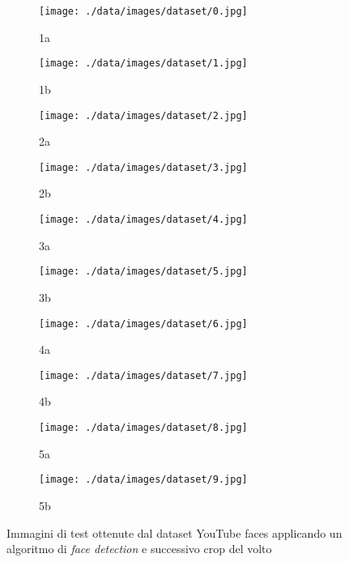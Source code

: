 \begin{figure}
	\centering
	\begin{subfigure}{0.2 \textwidth}
		\texttt{[image: ./data/images/dataset/0.jpg]}
		\caption{1a}
	\end{subfigure}
	\begin{subfigure}{0.2 \textwidth}
		\texttt{[image: ./data/images/dataset/1.jpg]}
		\caption{1b}
	\end{subfigure}
	\begin{subfigure}{0.2 \textwidth}
		\texttt{[image: ./data/images/dataset/2.jpg]}
		\caption{2a}
	\end{subfigure}
	\begin{subfigure}{0.2 \textwidth}
		\texttt{[image: ./data/images/dataset/3.jpg]}
		\caption{2b}
	\end{subfigure}
	\begin{subfigure}{0.2 \textwidth}
		\texttt{[image: ./data/images/dataset/4.jpg]}
		\caption{3a}
	\end{subfigure}
	\begin{subfigure}{0.2 \textwidth}
		\texttt{[image: ./data/images/dataset/5.jpg]}
		\caption{3b}
	\end{subfigure}
	\begin{subfigure}{0.2 \textwidth}
		\texttt{[image: ./data/images/dataset/6.jpg]}
		\caption{4a}
	\end{subfigure}
	\begin{subfigure}{0.2 \textwidth}
		\texttt{[image: ./data/images/dataset/7.jpg]}
		\caption{4b}
	\end{subfigure}
	\begin{subfigure}{0.2 \textwidth}
		\texttt{[image: ./data/images/dataset/8.jpg]}
		\caption{5a}
	\end{subfigure}
	\begin{subfigure}{0.2 \textwidth}
		\texttt{[image: ./data/images/dataset/9.jpg]}
		\caption{5b}
	\end{subfigure}
	\caption{Immagini di test ottenute dal dataset YouTube faces applicando un algoritmo di \textit{face detection} e successivo crop del volto \cite{wolf2011face}}
	\label{try_images}
\end{figure}

